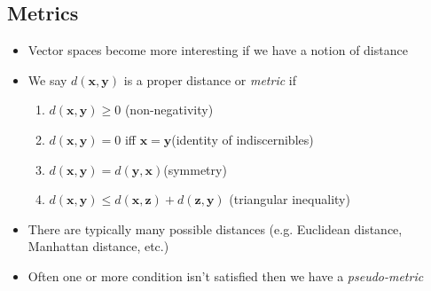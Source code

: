 \begin{slide}
\section[-1]{Metrics}

\begin{PauseHighLight}
  \begin{itemize}
  \item Vector spaces become more interesting if we have a notion of distance\pause
  \item We say $d(\bm{x}, \bm{y})$ is a proper distance or \emph{metric} if
    \begin{enumerate}\squeeze
    \item $d(\bm{x}, \bm{y}) \geq 0$ \hfill (non-negativity)\pause
    \item $d(\bm{x}, \bm{y}) = 0$ iff $\bm{x} =\bm{y}$\hfill  (identity
      of indiscernibles)\pause
    \item $d(\bm{x}, \bm{y}) = d(\bm{y}, \bm{x})$\hfill (symmetry)\pause
    \item $d(\bm{x}, \bm{y}) \leq d(\bm{x}, \bm{z}) +d(\bm{z}, \bm{y})$
      \hfill(triangular inequality)\pause
    \end{enumerate}
  \item There are typically many possible distances (e.g. Euclidean
    distance, Manhattan distance, etc.)\pause
  \item Often one or more condition isn't satisfied then we have a
    \emph{pseudo-metric}\pause
  \end{itemize}
\end{PauseHighLight}

\end{slide}




